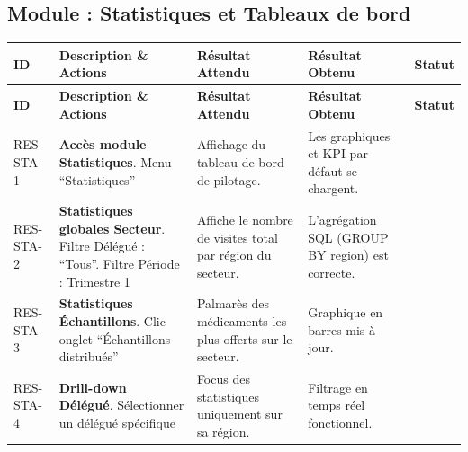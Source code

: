 \documentclass[a4paper,10pt]{article}
\newcommand{\cmark}{\textcolor{green!70!black}{\ding{51}}}
\begin{document}
\subsection{Module : Statistiques et Tableaux de bord}
\begin{longtable}{|p{1.2cm}|p{5cm}|p{4.5cm}|p{4.5cm}|c|}
\hline
\textbf{ID} & \textbf{Description \& Actions} & \textbf{Résultat Attendu} & \textbf{Résultat Obtenu} & \textbf{Statut} \\
\hline
\endfirsthead
\hline
\textbf{ID} & \textbf{Description \& Actions} & \textbf{Résultat Attendu} & \textbf{Résultat Obtenu} & \textbf{Statut} \\
\hline
\endhead
RES-STA-1 & \textbf{Accès module Statistiques}\newline 1. Menu ``Statistiques'' & Affichage du tableau de bord de pilotage. & Les graphiques et KPI par défaut se chargent. & \cmark \\
\hline
RES-STA-2 & \textbf{Statistiques globales Secteur}\newline 1. Filtre Délégué : ``Tous''\newline 2. Filtre Période : Trimestre 1 & Affiche le nombre de visites total par région du secteur. & L'agrégation SQL (GROUP BY region) est correcte. & \cmark \\
\hline
RES-STA-3 & \textbf{Statistiques Échantillons}\newline 1. Clic onglet ``Échantillons distribués'' & Palmarès des médicaments les plus offerts sur le secteur. & Graphique en barres mis à jour. & \cmark \\
\hline
RES-STA-4 & \textbf{Drill-down Délégué}\newline 1. Sélectionner un délégué spécifique & Focus des statistiques uniquement sur sa région. & Filtrage en temps réel fonctionnel. & \cmark \\
\hline
\end{longtable}
\end{document}
